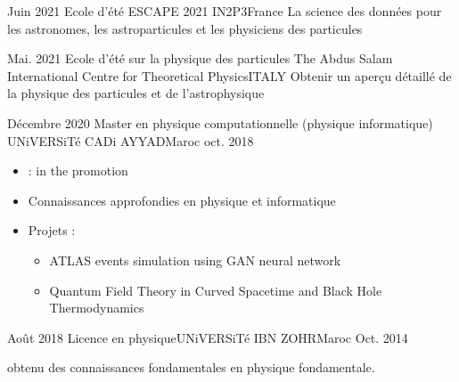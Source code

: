 %
%
%

\begin{experiences}

  \experience
  {Juin 2021}  {Ecole d'été ESCAPE 2021 }{IN2P3}{France}
  {}  	{La science des données pour les astronomes, les astroparticules et les physiciens des particules}
                  {}   
  \emptySeparator   

  \experience
  {Mai. 2021}  {Ecole d'été sur la physique des particules }{The Abdus Salam International Centre for Theoretical Physics}{ITALY}
  {}  	{Obtenir un aperçu détaillé de la physique des particules et de l'astrophysique }
                  {}   
  \emptySeparator     

  \experience
  {Décembre 2020}       {Master en physique computationnelle (physique informatique) }{UNiVERSiTé CADi AYYAD}{Maroc}
  {oct. 2018}  
     {
                      \begin{itemize}
                        \item {:  in the promotion}
                        \item Connaissances approfondies en physique et informatique
                        \item Projets : 
                        \begin{itemize}
                          \item ATLAS events simulation using  GAN neural network
                          \item Quantum Field Theory in Curved Spacetime and Black Hole Thermodynamics
                        \end{itemize}
                      \end{itemize}
                    }
                    {}
  \emptySeparator         
  \experience
  {Août 2018}  {Licence en physique}{UNiVERSiTé IBN ZOHR}{Maroc}
  {Oct. 2014}   {
    obtenu des connaissances fondamentales en physique fondamentale.  
                      
                  }
                  {}  
\end{experiences}
